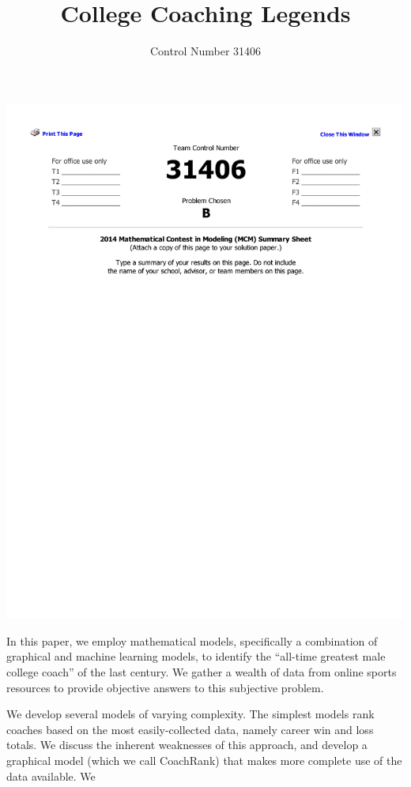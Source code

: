 \documentclass[11pt,notitlepage]{article}
\begin{document}
\fancyhf{}
\includegraphics[trim= 100 500 100 100]{summary_sheet.pdf}

In this paper, we employ mathematical models, specifically a combination of graphical and machine learning models, to identify the ``all-time greatest male college coach'' of the last century. We gather a wealth of data from online sports resources to provide objective answers to this subjective problem.

We develop several models of varying complexity. The simplest models rank coaches based on the most easily-collected data, namely career win and loss totals. We discuss the inherent weaknesses of this approach, and develop a graphical model (which we call CoachRank) that makes more complete use of the data available. We 

\pagestyle{fancyplain}
\fancyhf{}
\setlength{\headsep}{0.2in} 

\title{College Coaching Legends}
\author{Control Number 31406}
\maketitle
\end{document}
